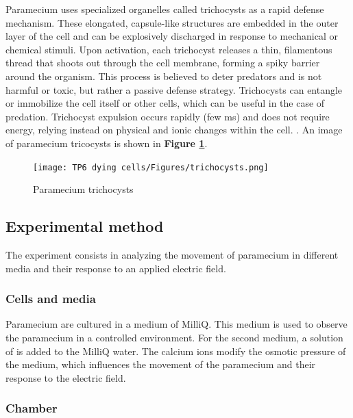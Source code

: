 \noindent
\begin{minipage}{0.57\textwidth}
    Paramecium uses specialized organelles called trichocysts as a rapid defense mechanism. These elongated, capsule-like structures are embedded in the outer layer of the cell and can be explosively discharged in response to mechanical or chemical stimuli. Upon activation, each trichocyst releases a thin, filamentous thread that shoots out through the cell membrane, forming a spiky barrier around the organism. This process is believed to deter predators and is not harmful or toxic, but rather a passive defense strategy. Trichocysts can entangle or immobilize the cell itself or other cells, which can be useful in the case of predation. Trichocyst expulsion occurs rapidly (few ms) and does not require energy, relying instead on physical and ionic changes within the cell. \cite{hausmann2003}. An image of paramecium tricocysts is shown in \textbf{Figure \ref{fig:trichocysts}}.
    
\end{minipage}
\hfill
\begin{minipage}{0.4\textwidth}
    \begin{figure}[H]
    \centering 
    \captionsetup{width=1\linewidth, justification=centering}
    \texttt{[image: TP6 dying cells/Figures/trichocysts.png]}
    \caption{Paramecium trichocysts \cite{trichocysts}}
    \label{fig:trichocysts}
    \end{figure}
\end{minipage}
\noindent
\subsection{Experimental method}

The experiment consists in analyzing the movement of paramecium in different media and their response to an applied electric field.

\subsubsection{Cells and media}

Paramecium are cultured in a medium of MilliQ. This medium is used to observe the paramecium in a controlled environment. For the second medium, a solution of  is added to the MilliQ water. The calcium ions modify the osmotic pressure of the medium, which influences the movement of the paramecium and their response to the electric field.

\subsubsection{Chamber}

